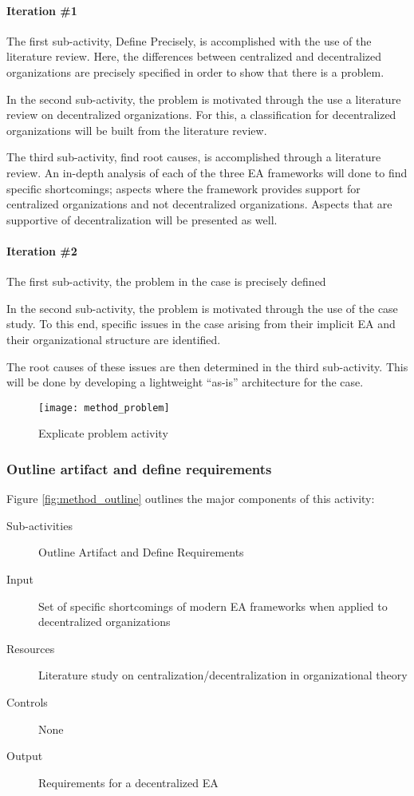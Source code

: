 \paragraph{Iteration \#1}

The first sub-activity, Define Precisely, is accomplished with the use of the literature review. Here, the differences between centralized and decentralized  organizations are precisely specified in order to show that there is a problem. 

In the second sub-activity, the problem is motivated through the use a literature review on decentralized organizations. For this, a classification for decentralized organizations will be built from the literature review.

The third sub-activity, find root causes, is accomplished through a literature review. An in-depth analysis of each of the three EA frameworks will done to find specific shortcomings; aspects where the framework provides support for centralized organizations and not decentralized organizations. Aspects that are supportive of decentralization will be presented as well.

\paragraph{Iteration \#2}

The first sub-activity, the problem in the case is precisely defined 

In the second sub-activity, the problem is motivated through the use of the case study. To this end, specific issues in the case arising from their implicit EA and their organizational structure are identified.

The root causes of these issues are then determined in the third sub-activity. This will be done by developing a lightweight ``as-is'' architecture for the case. 

\begin{figure}
\centering
\texttt{[image: method\_problem]}
\caption{Explicate problem activity}
\label{fig:method_problem}
\end{figure}

\subsubsection*{Outline artifact and define requirements}

Figure \ref{fig:method_outline} outlines the major components of this activity:
\begin{description}
  \item[Sub-activities] Outline Artifact and Define Requirements~\cite[Ch. 6]{johannessonPerjons2012}
  \item[Input] Set of specific shortcomings of modern EA frameworks when applied to decentralized organizations
  \item[Resources] Literature study on centralization/decentralization in  organizational theory
  \item[Controls] None
  \item[Output] Requirements for a decentralized EA
\end{description}

